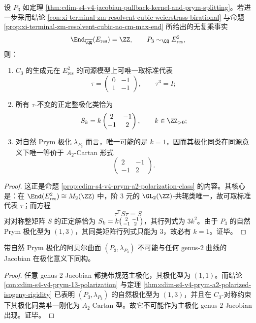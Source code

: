 \begin{theorem}\label{thm:cdim-s4-v4-prym-a2-polarized-isogeny-rigidity}
设 \(P_3\) 如定理 \ref{thm:cdim-s4-v4-jacobian-pullback-kernel-and-prym-splitting}。若进一步采用结论 \ref{con:xi-terminal-zm-resolvent-cubic-weierstrass-birational} 与命题 \ref{prop:xi-terminal-zm-resolvent-cubic-no-cm-max-end} 所给出的无复乘事实
\[
\End_{\overline{\QQ}}(E_{\mathrm{res}})=\ZZ,
\qquad
P_3\sim_{\QQ}E_{\mathrm{res}}^2,
\]
则：
\begin{enumerate}
  \item \(C_3\) 的生成元在 \(E_{\mathrm{res}}^2\) 的同源模型上可唯一取标准代表
  \[
  \tau=
  \begin{pmatrix}
  0&-1\\
  1&-1
  \end{pmatrix},
  \qquad \tau^3=I;
  \]
  \item 所有 \(\tau\)-不变的正定整极化类恰为
  \[
  S_k=
  k\begin{pmatrix}
  2&-1\\
  -1&2
  \end{pmatrix},
  \qquad k\in\ZZ_{>0};
  \]
  \item 对自然 Prym 极化 \(\lambda_{P_3}\) 而言，唯一可能的是 \(k=1\)，因而其极化同类在同源意义下唯一等价于 \(A_2\)-Cartan 形式
  \[
  \begin{pmatrix}
  2&-1\\
  -1&2
  \end{pmatrix}.
  \]
\end{enumerate}
\end{theorem}
\begin{proof}
这正是命题 \ref{prop:cdim-s4-v4-prym-a2-polarization-class} 的内容。其核心是：在 \(\End(E_{\mathrm{res}}^2)\cong M_2(\ZZ)\) 中，阶 \(3\) 元的 \(\GL_2(\ZZ)\)-共轭类唯一，故可取标准代表 \(\tau\)；而方程
\[
\tau^{\mathsf T}S\tau=S
\]
对对称整矩阵 \(S\) 的正定解恰为 \(S_k=k\begin{psmallmatrix}2&-1\\ -1&2\end{psmallmatrix}\)，其行列式为 \(3k^2\)。由于 \(P_3\) 的自然 Prym 极化型为 \((1,3)\)，其同类矩阵行列式只能为 \(3\)，故必有 \(k=1\)。证毕。
\end{proof}

\begin{corollary}\label{cor:cdim-s4-v4-prym-not-principally-polarized-genus2-jacobian}
带自然 Prym 极化的阿贝尔曲面 \((P_3,\lambda_{P_3})\) 不可能与任何 genus-\(2\) 曲线的 Jacobian 在极化意义下同构。
\end{corollary}
\begin{proof}
任意 genus-\(2\) Jacobian 都携带规范主极化，其极化型为 \((1,1)\)。而结论 \ref{con:cdim-s4-v4-prym-13-polarization} 与定理 \ref{thm:cdim-s4-v4-prym-a2-polarized-isogeny-rigidity} 已表明 \((P_3,\lambda_{P_3})\) 的自然极化型为 \((1,3)\)，并且在 \(C_3\)-对称约束下其极化同类唯一刚化为 \(A_2\)-Cartan 型。故它不可能作为主极化 genus-\(2\) Jacobian 出现。证毕。
\end{proof}

